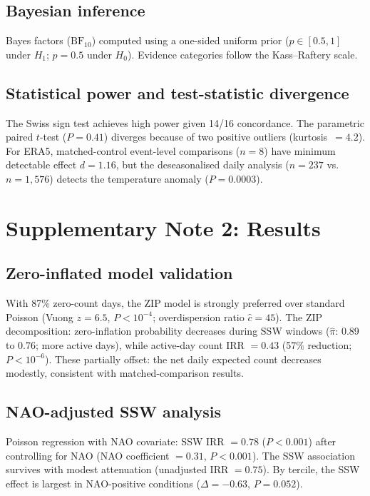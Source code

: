 \documentclass[11pt,letterpaper]{article}
\begin{document}
\subsection{Bayesian inference}

Bayes factors ($\mathrm{BF}_{10}$) computed using a one-sided uniform prior ($p \in [0.5, 1]$ under $H_1$; $p = 0.5$ under $H_0$). Evidence categories follow the Kass--Raftery scale.

\subsection{Statistical power and test-statistic divergence}

The Swiss sign test achieves high power given 14/16 concordance. The parametric paired $t$-test ($P = 0.41$) diverges because of two positive outliers (kurtosis~$= 4.2$). For ERA5, matched-control event-level comparisons ($n = 8$) have minimum detectable effect $d = 1.16$, but the deseasonalised daily analysis ($n = 237$ vs.\ $n = 1{,}576$) detects the temperature anomaly ($P = 0.0003$).

\section{Supplementary Note 2: Results}

\subsection{Zero-inflated model validation}

With 87\% zero-count days, the ZIP model is strongly preferred over standard Poisson (Vuong $z = 6.5$, $P < 10^{-4}$; overdispersion ratio $\hat{c} = 45$). The ZIP decomposition: zero-inflation probability decreases during SSW windows ($\hat{\pi}$: 0.89 to 0.76; more active days), while active-day count IRR $= 0.43$ (57\% reduction; $P < 10^{-6}$). These partially offset: the net daily expected count decreases modestly, consistent with matched-comparison results.

\subsection{NAO-adjusted SSW analysis}

Poisson regression with NAO covariate: SSW IRR $= 0.78$ ($P < 0.001$) after controlling for NAO (NAO coefficient $= 0.31$, $P < 0.001$). The SSW association survives with modest attenuation (unadjusted IRR $= 0.75$). By tercile, the SSW effect is largest in NAO-positive conditions ($\Delta = -0.63$, $P = 0.052$).
\end{document}
